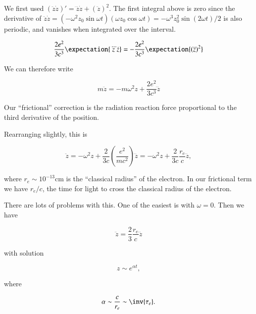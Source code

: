 We first used $(\ddot{z} \dot{z})' = \dddot{z} \dot{z} + (\ddot{z})^2$.  The first integral above is zero since the derivative of $\ddot{z} \dot{z} = (-\omega^2 z_0 \sin\omega t)(\omega z_0 \cos\omega t) = -\omega^3 z_0^2 \sin(2 \omega t)/2$ is also periodic, and vanishes when integrated over the interval.  

\begin{equation}\label{eqn:relativisticElectrodynamicsL26:350}
\frac{2 e^2}{3 c^3} \expectation{ \dddot{z} \dot{z} } =
-\frac{2 e^2}{3 c^3} \expectation{ (\ddot{z})^2 }
\end{equation}

We can therefore write

\begin{equation}\label{eqn:relativisticElectrodynamicsL26:370}
m \ddot{z} = -m \omega^2 z + \frac{2 e^2}{3 c^3} \dddot{z}
\end{equation}

Our ``frictional'' correction is the radiation reaction force proportional to the third derivative of the position.

Rearranging slightly, this is

\begin{equation}\label{eqn:relativisticElectrodynamicsL26:390}
\ddot{z} = - \omega^2 z + \frac{2}{3 c} \left( \frac{e^2}{m c^2} \right) \dddot{z}
 = - \omega^2 z + \frac{2}{3 c} \frac{r_e}{c} \dddot{z},
\end{equation}

where $r_e \sim 10^{-13} \text{cm}$ is the ``classical radius'' of the electron.  In our frictional term we have $r_e/c$, the time for light to cross the classical radius of the electron.

There are lots of problems with this.  One of the easiest is with $\omega = 0$.  Then we have

\begin{equation}\label{eqn:relativisticElectrodynamicsL26:410}
\ddot{z} = \frac{2}{3} \frac{r_e}{c} \dddot{z}
\end{equation}

with solution 

\begin{equation}\label{eqn:relativisticElectrodynamicsL26:430}
z \sim e^{\alpha t},
\end{equation}

where

\begin{equation}\label{eqn:relativisticElectrodynamicsL26:450}
\alpha \sim \frac{c}{r_e} \sim \inv{\tau_e}.
\end{equation}

